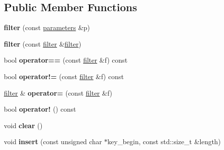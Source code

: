 \subsection*{Public Member Functions}
\begin{DoxyCompactItemize}
\item 
\hypertarget{classstrtk_1_1bloom_1_1filter_a752bb5ac59bbb72a6caccdcd0aa50af9}{{\bfseries filter} (const \hyperlink{classstrtk_1_1bloom_1_1parameters}{parameters} \&p)}\label{classstrtk_1_1bloom_1_1filter_a752bb5ac59bbb72a6caccdcd0aa50af9}

\item 
\hypertarget{classstrtk_1_1bloom_1_1filter_a2462cb34bc3ee0f5d55f606bf28e1468}{{\bfseries filter} (const \hyperlink{classstrtk_1_1bloom_1_1filter}{filter} \&\hyperlink{classstrtk_1_1bloom_1_1filter}{filter})}\label{classstrtk_1_1bloom_1_1filter_a2462cb34bc3ee0f5d55f606bf28e1468}

\item 
\hypertarget{classstrtk_1_1bloom_1_1filter_aa2d8739ea23739be5cd34b532b969aad}{bool {\bfseries operator==} (const \hyperlink{classstrtk_1_1bloom_1_1filter}{filter} \&f) const }\label{classstrtk_1_1bloom_1_1filter_aa2d8739ea23739be5cd34b532b969aad}

\item 
\hypertarget{classstrtk_1_1bloom_1_1filter_aae7d76b2e8ccf0abb2f10108bd73d3e2}{bool {\bfseries operator!=} (const \hyperlink{classstrtk_1_1bloom_1_1filter}{filter} \&f) const }\label{classstrtk_1_1bloom_1_1filter_aae7d76b2e8ccf0abb2f10108bd73d3e2}

\item 
\hypertarget{classstrtk_1_1bloom_1_1filter_a40aef1a33538d6fc0559f2663b4cb89e}{\hyperlink{classstrtk_1_1bloom_1_1filter}{filter} \& {\bfseries operator=} (const \hyperlink{classstrtk_1_1bloom_1_1filter}{filter} \&f)}\label{classstrtk_1_1bloom_1_1filter_a40aef1a33538d6fc0559f2663b4cb89e}

\item 
\hypertarget{classstrtk_1_1bloom_1_1filter_ae818512d8324a0face92d2ec6bb6e5a9}{bool {\bfseries operator!} () const }\label{classstrtk_1_1bloom_1_1filter_ae818512d8324a0face92d2ec6bb6e5a9}

\item 
\hypertarget{classstrtk_1_1bloom_1_1filter_ae11aea64449fa1e0bbac52b85f19fb7c}{void {\bfseries clear} ()}\label{classstrtk_1_1bloom_1_1filter_ae11aea64449fa1e0bbac52b85f19fb7c}

\item 
\hypertarget{classstrtk_1_1bloom_1_1filter_a9d5c073bfa7a01fb299ff6fc50139f77}{void {\bfseries insert} (const unsigned char $\ast$key\-\_\-begin, const std\-::size\-\_\-t \&length)}\label{classstrtk_1_1bloom_1_1filter_a9d5c073bfa7a01fb299ff6fc50139f77}


\end{DoxyCompactItemize}
